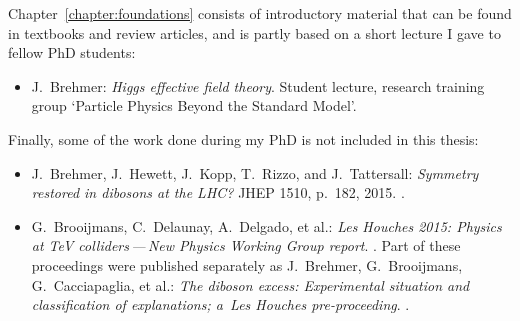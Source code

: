 %
Chapter~\ref{chapter:foundations} consists of introductory material
that can be found in textbooks and review articles, and is partly
based on a short lecture I gave to fellow PhD students:
%
\begin{itemize}
  \item[\cite{Brehmer:EFTlecture}]  J.~Brehmer:\newline
	\emph{Higgs effective field theory}.\newline
        Student lecture, research training group `Particle Physics Beyond the Standard Model'.
\end{itemize}

\begin{samepage}
Finally, some of the work done during my PhD is not included in this thesis:
%
\begin{itemize}
  \item[\cite{Brehmer:2015cia}] J.~Brehmer, J.~Hewett, J.~Kopp, T.~Rizzo, and J.~Tattersall:\newline
	\emph{Symmetry restored in dibosons at the LHC?} \newline
	JHEP 1510, p.~182, 2015. .
  \item[\cite{Brehmer:2015dan,Brooijmans:2016vro}] G.~Brooijmans, C.~Delaunay, A.~Delgado, et al.:\newline
         \emph{Les Houches 2015: Physics at TeV colliders\,---\,New Physics Working Group report}.\newline
        .\newline
         Part of these proceedings were published separately as\newline
         J.~Brehmer, G.~Brooijmans,  G.~Cacciapaglia, et al.:\newline
	\emph{The diboson excess: Experimental situation and classification of explanations; a~Les Houches pre-proceeding}.\newline
	.
\end{itemize}
\end{samepage}
